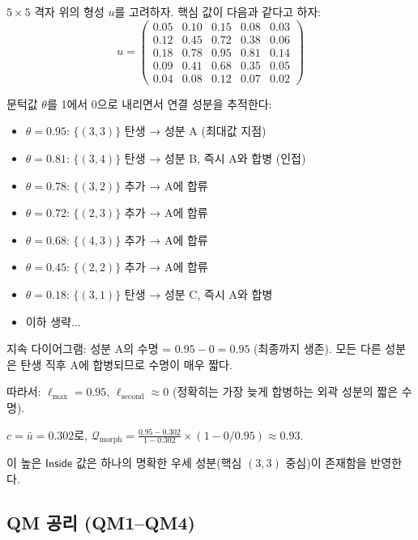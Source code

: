 \begin{example}[H0 지속 다이어그램의 수동 계산]
\label{ex:h0-persistence}
$5 \times 5$ 격자 위의 형성 $u$를 고려하자. 핵심 값이 다음과 같다고 하자:
\begin{equation}
    u = \begin{pmatrix}
    0.05 & 0.10 & 0.15 & 0.08 & 0.03 \\
    0.12 & 0.45 & 0.72 & 0.38 & 0.06 \\
    0.18 & 0.78 & 0.95 & 0.81 & 0.14 \\
    0.09 & 0.41 & 0.68 & 0.35 & 0.05 \\
    0.04 & 0.08 & 0.12 & 0.07 & 0.02
    \end{pmatrix} \nonumber
\end{equation}

문턱값 $\theta$를 1에서 0으로 내리면서 연결 성분을 추적한다:
\begin{itemize}
    \item $\theta = 0.95$: $\{(3,3)\}$ 탄생 → 성분 A (최대값 지점)
    \item $\theta = 0.81$: $\{(3,4)\}$ 탄생 → 성분 B, 즉시 A와 합병 (인접)
    \item $\theta = 0.78$: $\{(3,2)\}$ 추가 → A에 합류
    \item $\theta = 0.72$: $\{(2,3)\}$ 추가 → A에 합류
    \item $\theta = 0.68$: $\{(4,3)\}$ 추가 → A에 합류
    \item $\theta = 0.45$: $\{(2,2)\}$ 추가 → A에 합류
    \item $\theta = 0.18$: $\{(3,1)\}$ 탄생 → 성분 C, 즉시 A와 합병
    \item 이하 생략...
\end{itemize}

지속 다이어그램: 성분 A의 수명 = $0.95 - 0 = 0.95$ (최종까지 생존). 모든 다른 성분은 탄생 직후 A에 합병되므로 수명이 매우 짧다.

따라서: $\ell_{\max} = 0.95$, $\ell_{\mathrm{second}} \approx 0$ (정확히는 가장 늦게 합병하는 외곽 성분의 짧은 수명).

$c = \bar{u} = 0.302$로, $\mathcal{Q}_{\mathrm{morph}} = \frac{0.95 - 0.302}{1 - 0.302} \times (1 - 0/0.95) \approx 0.93$.

이 높은 $\mathsf{Inside}$ 값은 하나의 명확한 우세 성분(핵심 $(3,3)$ 중심)이 존재함을 반영한다.
\end{example}

\subsection{QM 공리 (QM1--QM4)}

